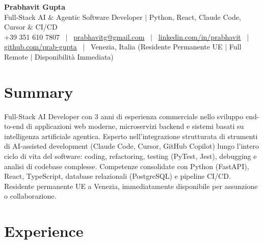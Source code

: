 \documentclass[a4paper,10pt]{article}
\begin{document}
\begin{minipage}[c]{0.80\textwidth}
  {\Huge\bfseries Prabhavit Gupta}\\[3pt]
  {\color{accent}\large Full-Stack AI $\&$ Agentic Software Developer $\vert$ Python, React, Claude Code, Cursor $\&$ CI/CD}\\[6pt]
  {\footnotesize +39 351 610 7807 ~$\vert$~
  \href{mailto:prabhavitg@gmail.com}{prabhavitg@gmail.com} ~$\vert$~
  \href{https://www.linkedin.com/in/prabhavit/}{linkedin.com/in/prabhavit} ~$\vert$~
  \href{https://github.com/prab-gupta}{github.com/prab-gupta} ~$\vert$~
  Venezia, Italia (Residente Permanente UE $\vert$ Full Remote $\vert$ Disponibilità Immediata)}
\end{minipage}\hfill

\section{Summary}
Full-Stack AI Developer con 3 anni di esperienza commerciale nello sviluppo end-to-end di applicazioni web moderne, microservizi backend e sistemi basati su intelligenza artificiale agentica. Esperto nell'integrazione strutturata di strumenti di AI-assisted development (Claude Code, Cursor, GitHub Copilot) lungo l'intero ciclo di vita del software: coding, refactoring, testing (PyTest, Jest), debugging e analisi di codebase complesse. Competenze consolidate con Python (FastAPI), React, TypeScript, database relazionali (PostgreSQL) e pipeline CI/CD. Residente permanente UE a Venezia, immediatamente disponibile per assunzione o collaborazione.

\section{Experience}
\end{document}

